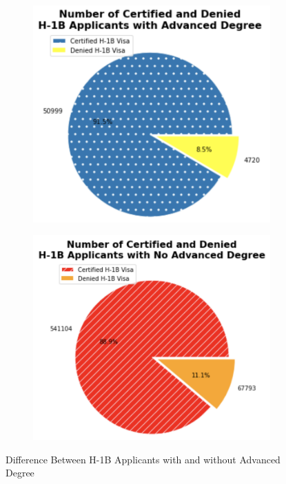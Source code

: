 \documentclass[conference]{IEEEtran}
\begin{document}
\begin{figure}[h]
     \begin{subfigure}[h]{0.2\textwidth}
         \centering
         \hbox{\hspace{0em}\includegraphics[scale = 0.3]{Cert_Den_Adv.png}}
     \end{subfigure}
     \hfill
     \begin{subfigure}[h]{0.2\textwidth}
         \centering
         \hbox{\hspace{-8em}\includegraphics[scale=0.3]{Cert_Den_nAdv.png}}
     \end{subfigure}
        \caption{Difference Between H-1B Applicants with and without Advanced Degree}
        \label{fig_adv_nadv_2}
\end{figure}
\end{document}
